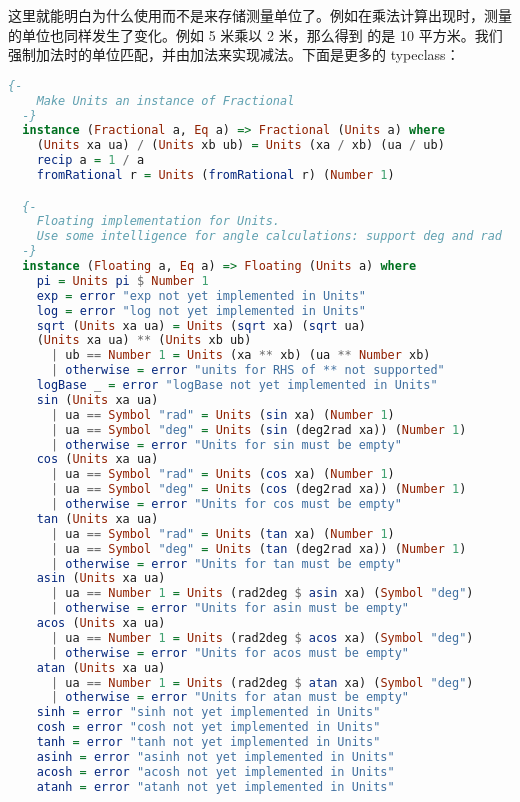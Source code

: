 \documentclass[./main.tex]{subfiles}
\begin{document}
这里就能明白为什么使用而不是来存储测量单位了。例如在乘法计算出现时，测量的单位也同样发生了变化。例如 5 米乘以 2 米，那么得到
的是 10 平方米。我们强制加法时的单位匹配，并由加法来实现减法。下面是更多的 typeclass：

\begin{lstlisting}[language=Haskell]
  {-
    Make Units an instance of Fractional
  -}
  instance (Fractional a, Eq a) => Fractional (Units a) where
    (Units xa ua) / (Units xb ub) = Units (xa / xb) (ua / ub)
    recip a = 1 / a
    fromRational r = Units (fromRational r) (Number 1)

  {-
    Floating implementation for Units.
    Use some intelligence for angle calculations: support deg and rad
  -}
  instance (Floating a, Eq a) => Floating (Units a) where
    pi = Units pi $ Number 1
    exp = error "exp not yet implemented in Units"
    log = error "log not yet implemented in Units"
    sqrt (Units xa ua) = Units (sqrt xa) (sqrt ua)
    (Units xa ua) ** (Units xb ub)
      | ub == Number 1 = Units (xa ** xb) (ua ** Number xb)
      | otherwise = error "units for RHS of ** not supported"
    logBase _ = error "logBase not yet implemented in Units"
    sin (Units xa ua)
      | ua == Symbol "rad" = Units (sin xa) (Number 1)
      | ua == Symbol "deg" = Units (sin (deg2rad xa)) (Number 1)
      | otherwise = error "Units for sin must be empty"
    cos (Units xa ua)
      | ua == Symbol "rad" = Units (cos xa) (Number 1)
      | ua == Symbol "deg" = Units (cos (deg2rad xa)) (Number 1)
      | otherwise = error "Units for cos must be empty"
    tan (Units xa ua)
      | ua == Symbol "rad" = Units (tan xa) (Number 1)
      | ua == Symbol "deg" = Units (tan (deg2rad xa)) (Number 1)
      | otherwise = error "Units for tan must be empty"
    asin (Units xa ua)
      | ua == Number 1 = Units (rad2deg $ asin xa) (Symbol "deg")
      | otherwise = error "Units for asin must be empty"
    acos (Units xa ua)
      | ua == Number 1 = Units (rad2deg $ acos xa) (Symbol "deg")
      | otherwise = error "Units for acos must be empty"
    atan (Units xa ua)
      | ua == Number 1 = Units (rad2deg $ atan xa) (Symbol "deg")
      | otherwise = error "Units for atan must be empty"
    sinh = error "sinh not yet implemented in Units"
    cosh = error "cosh not yet implemented in Units"
    tanh = error "tanh not yet implemented in Units"
    asinh = error "asinh not yet implemented in Units"
    acosh = error "acosh not yet implemented in Units"
    atanh = error "atanh not yet implemented in Units"
\end{lstlisting}
\end{document}
